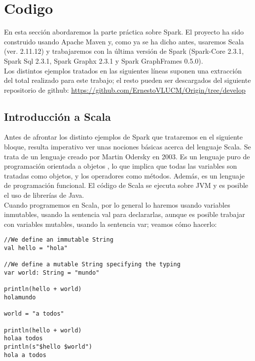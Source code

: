 \chapter{Codigo}

En esta sección abordaremos la parte práctica sobre Spark. El proyecto ha sido construido usando Apache Maven y, como ya se ha dicho antes, usaremos Scala (ver. 2.11.12) y trabajaremos con la última versión de Spark (Spark-Core 2.3.1, Spark Sql 2.3.1, Spark Graphx 2.3.1 y Spark GraphFrames 0.5.0).\\

Los distintos ejemplos tratados en las siguientes líneas suponen una extracción del total realizado para este trabajo; el resto pueden ser descargados del siguiente repositorio de  github: \textcolor{blue}{\underline{\url{https://github.com/ErnestoVLUCM/Origin/tree/develop}}} 

\section{Introducción a Scala}

Antes de afrontar los distinto ejemplos de Spark que trataremos en el siguiente bloque, resulta imperativo ver unas nociones básicas acerca del lenguaje Scala. Se trata de un lenguaje creado por Martin Odersky en 2003. Es un lenguaje puro de programación orientada a objetos \cite{scalaCoockbook}, lo que implica que todas las variables son tratadas como objetos, y los operadores como métodos. Además, es un lenguaje de programación funcional. El código de Scala se ejecuta sobre JVM y es posible el uso de librerías de Java.\\

Cuando programemos en Scala, por lo general lo haremos usando variables inmutables, usando la sentencia val para declararlas, aunque es posible trabajar con variables mutables, usando la sentencia var; veamos cómo hacerlo:\\

\begin{lstlisting}[frame=single]
//We define an immutable String
val hello = "hola"

//We define a mutable String specifying the typing
var world: String = "mundo"

println(hello + world)
holamundo

world = "a todos"

println(hello + world)
holaa todos
println(s"$hello $world")
hola a todos
\end{lstlisting}

